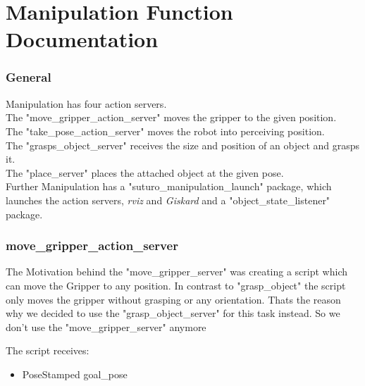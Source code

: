 \documentclass[main.tex]{subfiles}
\begin{document}
	\begingroup

	\renewcommand{\cleardoublepage}{}

	\renewcommand{\clearpage}{}

	\chapter{Manipulation Function Documentation}


		
		\subsection{General}

		Manipulation has four action servers.\\
		The "move\_gripper\_action\_server" moves the gripper to the given position.\\
		The "take\_pose\_action\_server" moves the robot into perceiving position.\\
		The "grasps\_object\_server" receives the size and position of an object and grasps it.\\
		The "place\_server" places the attached object at the given pose.\\
		Further Manipulation has a "suturo\_manipulation\_launch" package, which launches the action servers, \textit{rviz} and \textit{Giskard} and a "object\_state\_listener" package.
		
		\newpage


		\subsection{move\_gripper\_action\_server} 
		The Motivation behind the "move\_gripper\_server" was creating a script which can move the Gripper to any position. In contrast to "grasp\_object" the script only moves the gripper without grasping or any orientation.
		Thats the reason why we decided to use the "grasp\_object\_server" for this task instead. So we don't use the "move\_gripper\_server" anymore
		
		\vspace{0.75cm}
		The script receives:
		\begin{itemize}
		 \item PoseStamped goal\_pose
     	\end{itemize} 
     	
\end{document}
